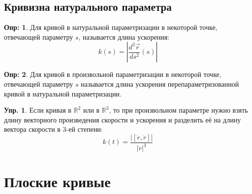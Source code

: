 \documentclass[12pt]{article}
\newcommand{\MR}{\mathbb{R}}
\theoremstyle{definition}
\newtheorem{defn}{Опр:}
\newtheorem{exrc}{Упр.}
\begin{document}
\subsection*{Кривизна натурального параметра}
\begin{defn}
	Для кривой в натуральной параметризации  в некоторой точке, отвечающей параметру $s$, называется длина ускорения:
	$$
		k(s) = \left| \dfrac{d^2 \vec{r}}{ds^2}(s) \right|
	$$
\end{defn}

\begin{defn}
	Для кривой в произвольной параметризации  в некоторой точке, отвечающей параметру $s$ называется длина ускорения перепараметризованной кривой в натуральной параметризации.
\end{defn}

\begin{exrc}
	Если кривая в $\MR^2$ или в $\MR^3$, то при произвольном параметре нужно взять длину векторного произведения скорости и ускорения и разделить её на длину вектора скорости в $3$-ей степени:
	$$
		k(t) = \dfrac{\left|[\dot{r},\ddot{r}]\right|}{|\dot{r}|^3}
	$$
\end{exrc}
\newpage

\section*{Плоские кривые}
\end{document}
